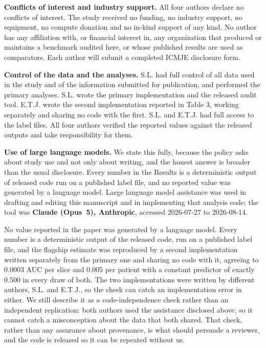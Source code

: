 \documentclass[11pt,letterpaper]{article}
\begin{document}
\textbf{Conflicts of interest and industry support.} All four authors declare no
conflicts of interest. The study received no funding, no industry support, no
equipment, no compute donation and no in-kind support of any kind. No author has
any affiliation with, or financial interest in, any organization that produced or
maintains a benchmark audited here, or whose published results are used as
comparators. Each author will submit a completed ICMJE disclosure form.

\textbf{Control of the data and the analyses.} S.L. had full control of all data
used in the study and of the information submitted for publication, and performed
the primary analyses. S.L. wrote the primary implementation and the released
audit tool. E.T.J. wrote the second implementation reported in Table 3, working
separately and sharing no code with the first. S.L. and E.T.J. had full access to
the label files. All four authors verified the reported values against the
released outputs and take responsibility for them.

\textbf{Use of large language models.} We state this fully, because the policy
asks about study use and not only about writing, and the honest answer is broader
than the usual disclosure. Every number in the Results is a deterministic output
of released code run on a published label file, and no reported value was
generated by a language model. Large language model assistance was used in
drafting and editing this manuscript and in implementing that analysis code; the
tool was \textbf{Claude (Opus~5), Anthropic}, accessed 2026-07-27 to
2026-08-14.

No value reported in the paper was generated by a language model. Every number is
a deterministic output of the released code, run on a published label file, and
the flagship estimate was reproduced by a second implementation written
separately from the primary one and sharing no code with it, agreeing to 0.0003
AUC per slice and 0.005 per patient with a constant predictor of exactly 0.500 in
every draw of both. The two implementations were written by different authors,
S.L. and E.T.J., so the check can catch an implementation error in either. We
still describe it as a code-independence check rather than an independent
replication: both authors used the assistance disclosed above, so it cannot catch
a misconception about the data that both shared. That check, rather than any
assurance about provenance, is what should persuade a reviewer, and the code is
released so it can be repeated without us.
\end{document}
